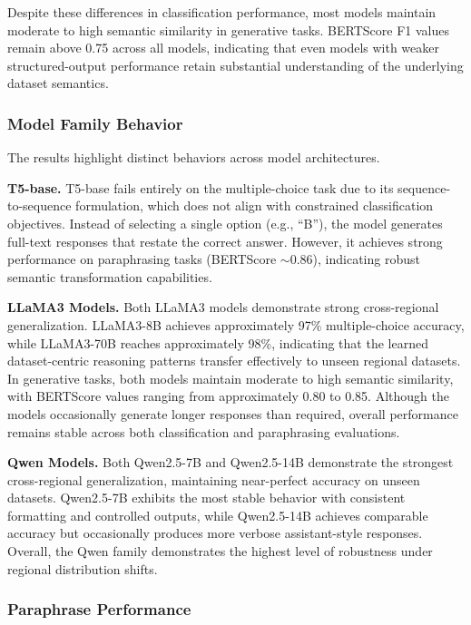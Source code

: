 \documentclass[a4paper,fleqn]{cas-sc}
\begin{document}
Despite these differences in classification performance, most models maintain moderate to high semantic similarity in generative tasks. BERTScore F1 values remain above 0.75 across all models, indicating that even models with weaker structured-output performance retain substantial understanding of the underlying dataset semantics.

\subsubsection{Model Family Behavior}

The results highlight distinct behaviors across model architectures.

\textbf{T5-base.}
T5-base fails entirely on the multiple-choice task due to its sequence-to-sequence formulation, which does not align with constrained classification objectives. Instead of selecting a single option (e.g., ``B''), the model generates full-text responses that restate the correct answer. However, it achieves strong performance on paraphrasing tasks (BERTScore $\sim$0.86), indicating robust semantic transformation capabilities.

\textbf{LLaMA3 Models.}
Both LLaMA3 models demonstrate strong cross-regional generalization. LLaMA3-8B achieves approximately 97\% multiple-choice accuracy, while LLaMA3-70B reaches approximately 98\%, indicating that the learned dataset-centric reasoning patterns transfer effectively to unseen regional datasets. In generative tasks, both models maintain moderate to high semantic similarity, with BERTScore values ranging from approximately 0.80 to 0.85. Although the models occasionally generate longer responses than required, overall performance remains stable across both classification and paraphrasing evaluations.

\textbf{Qwen Models.}
Both Qwen2.5-7B and Qwen2.5-14B demonstrate the strongest cross-regional generalization, maintaining near-perfect accuracy on unseen datasets. Qwen2.5-7B exhibits the most stable behavior with consistent formatting and controlled outputs, while Qwen2.5-14B achieves comparable accuracy but occasionally produces more verbose assistant-style responses. Overall, the Qwen family demonstrates the highest level of robustness under regional distribution shifts.

\subsubsection{Paraphrase Performance}
\end{document}
